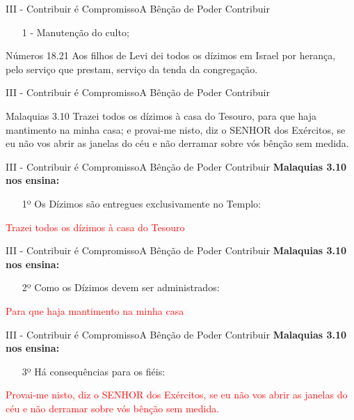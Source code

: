 \documentclass[14pt,aspectratio=169]{beamer}
\newcommand{\TT}{A Bênção de Poder Contribuir}
\newcommand{\PIII}{III - Contribuir é Compromisso}
\begin{document}
\begin{frame}{\PIII}{\TT}
 \begin{enumerate}
  \item[1 -] Manutenção do culto;\pause
 \end{enumerate}
 \begin{block}{Números 18.21}
 Aos filhos de Levi dei todos os dízimos em Israel por herança, pelo serviço que prestam, serviço da tenda da congregação.
 \end{block}
\end{frame}

\begin{frame}{\PIII}{\TT}
 \begin{block}{Malaquias 3.10}
\Large
Trazei todos os dízimos à casa do Tesouro, para que haja mantimento na minha casa; e provai-me nisto, diz o SENHOR dos Exércitos, se eu não vos abrir as janelas do céu e não derramar sobre vós bênção sem medida.
 \end{block}
\end{frame}

\begin{frame}{\PIII}{\TT}
 \textbf{Malaquias 3.10 nos ensina:}\pause
 \begin{enumerate}
  \item[1º] Os Dízimos são entregues exclusivamente no Templo:\pause
 \end{enumerate}
  \begin{center}
  \textcolor{red}{Trazei todos os dízimos à casa do Tesouro}
  \end{center} 
\end{frame}

\begin{frame}{\PIII}{\TT}
 \textbf{Malaquias 3.10 nos ensina:}
 \begin{enumerate}
  \item[2º] Como os Dízimos devem ser administrados:\pause
 \end{enumerate}
  \begin{center}
  \textcolor{red}{Para que haja mantimento na minha casa}
  \end{center}
\end{frame}

\begin{frame}{\PIII}{\TT}
 \textbf{Malaquias 3.10 nos ensina:}
 \begin{enumerate}
  \item[3º] Há consequências para os fiéis:\pause  
 \end{enumerate}
  \begin{center}
  \textcolor{red}{Provai-me nisto, diz o SENHOR dos Exércitos, se eu não vos abrir as janelas do céu e não derramar sobre vós bênção sem medida.}
  \end{center}
\end{frame}
\end{document}
